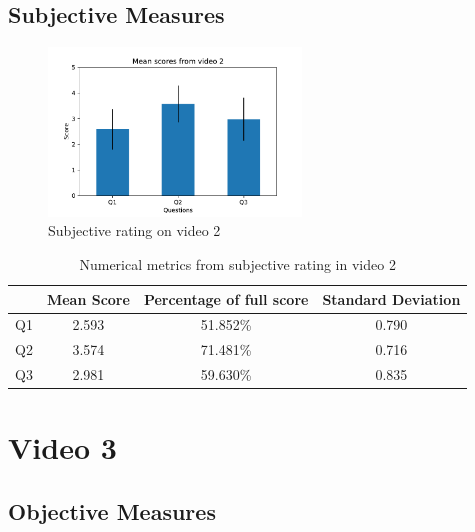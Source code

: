 \subsection{Subjective Measures}

\begin{figure}[H]
    \centering
    \includegraphics[width=0.6\textwidth]{img/subjective_measures/analysis/video_2.pdf}
    \caption{Subjective rating on video 2}
    \label{fig:visual_subj_vid2}
\end{figure}

\begin{table}[H]
    \centering
    \begin{tabular}{|c|c c c|} 
        \hline
           & \textbf{Mean Score} & \textbf{Percentage of full score} & \textbf{Standard Deviation} \\ [0.5ex] 
        \hline
        Q1 & 2.593 & 51.852\% & 0.790 \\ [1ex] 
        Q2 & 3.574 & 71.481\% & 0.716 \\ [1ex] 
        Q3 & 2.981 & 59.630\% & 0.835 \\ [1ex] 
        \hline
    \end{tabular}
    \caption{Numerical metrics from subjective rating in video 2}
    \label{tab:numerical_subj_vid2}
\end{table}



\section{Video 3}
\subsection{Objective Measures}

